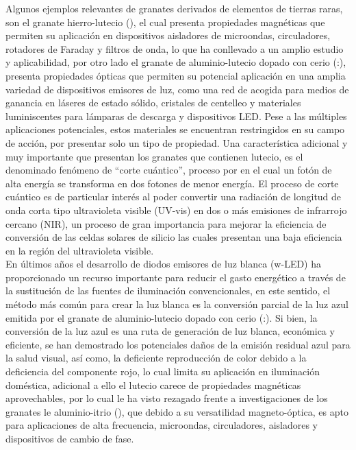 Algunos ejemplos relevantes de granates derivados de elementos de tierras
raras, son el granate hierro-lutecio (), el cual presenta
propiedades magnéticas que permiten su aplicación en dispositivos aisladores de
microondas, circuladores, rotadores de Faraday y filtros de onda\cite{Basavad2020,Crisp1998,Neel1964},
 lo que ha conllevado a un amplio estudio
y aplicabilidad, por otro lado el granate de aluminio-lutecio dopado con cerio
(:), presenta propiedades ópticas que permiten su
potencial aplicación en una amplia variedad de dispositivos emisores de luz,
como una red de acogida para medios de ganancia en láseres de estado sólido,
cristales de centelleo y materiales luminiscentes para lámparas de descarga y
dispositivos LED\cite{Ionov2005,Mares2004,Tous2008,Pan2004,Katelnikovas2008}.
Pese a las múltiples aplicaciones potenciales, estos materiales se encuentran
restringidos en su campo de acción, por presentar solo un tipo de propiedad.
Una característica adicional y muy importante que presentan los granates que
contienen lutecio, es el denominado fenómeno de “corte cuántico”, proceso por
en el cual un fotón de alta energía se transforma en dos fotones de menor
energía\cite{Yarici2016}. El proceso de corte cuántico es de particular
interés al poder convertir una radiación de longitud de onda corta tipo
ultravioleta visible (UV-vis) en dos o más emisiones de infrarrojo cercano
(NIR), un proceso de gran importancia para mejorar la eficiencia de conversión
de las celdas solares de silicio las cuales presentan una baja eficiencia en la
región del ultravioleta visible\cite{Krsmanovic2007}.\\

En últimos años el desarrollo de diodos emisores de luz blanca (w-LED) ha
proporcionado un recurso importante para reducir el gasto energético a través
de la sustitución de las fuentes de iluminación convencionales\cite{Garskaite2007}, 
en este sentido, el método más común para crear la luz
blanca es la conversión parcial de la luz azul emitida por el granate de
aluminio-lutecio dopado con cerio (:)\cite{Yamazaki1994}.
Si bien, la conversión de la luz azul es una ruta de generación de luz blanca,
económica y eficiente, se han demostrado los potenciales daños de la emisión
residual azul para la salud visual\cite{Psuja2007}, así como, la deficiente
reproducción de color debido a la deficiencia del componente rojo, lo cual
limita su aplicación en iluminación doméstica, adicional a ello el lutecio
carece de propiedades magnéticas aprovechables, por lo cual le ha visto
rezagado frente a investigaciones de los granates le aluminio-itrio
(), que debido a su versatilidad magneto-óptica, es apto para
aplicaciones de alta frecuencia, microondas, circuladores, aisladores y
dispositivos de cambio de fase\cite{Hapishah2017,Setlur2006}.\\

